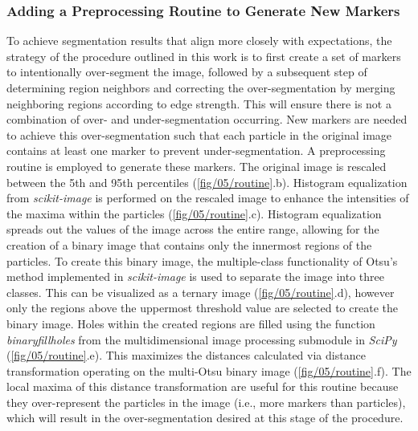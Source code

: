 \subsubsection{Adding a Preprocessing Routine to Generate New Markers}
To achieve segmentation results that align more closely with expectations,
the strategy of the procedure outlined in this work is to first create a set
of markers to intentionally over-segment the image, followed by a
subsequent step of determining region neighbors and correcting the
over-segmentation by merging neighboring regions
according to edge strength. This will ensure there is not a combination of
over- and under-segmentation occurring. New markers are needed
to achieve this over-segmentation such that each particle in the original
image contains at least one marker to prevent under-segmentation.
A preprocessing routine is employed to
generate these markers. The original image is rescaled between the 5th and
95th percentiles (\ref{fig/05/routine}.b).
Histogram equalization from \textit{scikit-image} is
performed on the rescaled image to enhance the intensities of the maxima
within the particles (\ref{fig/05/routine}.c).
Histogram equalization spreads out the values of the image
across the entire range, allowing for the creation of a binary image that
contains only the innermost regions of the particles. To create this
binary image, the multiple-class functionality of Otsu's method
implemented in \textit{scikit-image} is used to separate the image into three
classes. This can be visualized as a ternary image
(\ref{fig/05/routine}.d), however
only the regions above the uppermost threshold value are selected to
create the binary image. Holes within the created regions are filled using
the function \textit{binary\textunderscore fill\textunderscore holes}
from the multidimensional image processing
submodule in \textit{SciPy} (\ref{fig/05/routine}.e).
This maximizes the distances calculated via
distance transformation operating on the multi-Otsu binary image
(\ref{fig/05/routine}.f). The local maxima of this distance
transformation are useful for this
routine because they over-represent the particles in the image
(i.e., more markers than particles), which will result in the
over-segmentation desired at this stage of the procedure.

